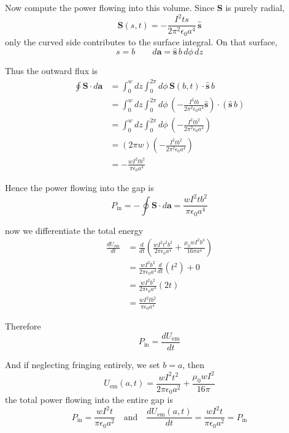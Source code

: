 \documentclass[12pt]{article}
\begin{document}
\begin{enumerate}
Now compute the power flowing into this volume. Since \(\mathbf S\) is purely radial,
$$
\mathbf S(s,t)
=
-\frac{I^2ts}{2\pi^2\epsilon_0 a^4}\,\hat{\mathbf s}
$$
only the curved side contributes to the surface integral. On that surface,
$$
s=b
\qquad
d\mathbf a=\hat{\mathbf s}\,b\,d\phi\,dz
$$

Thus the outward flux is
$$
\begin{aligned}
\oint \mathbf S\cdot d\mathbf a
&=
\int_0^w dz\int_0^{2\pi}d\phi\,
\mathbf S(b,t)\cdot \hat{\mathbf s}\,b \\
&=
\int_0^w dz\int_0^{2\pi}d\phi\,
\left(
-\frac{I^2tb}{2\pi^2\epsilon_0 a^4}\hat{\mathbf s}
\right)\cdot
\left(
\hat{\mathbf s}\,b
\right) \\
&=
\int_0^w dz\int_0^{2\pi}d\phi\,
\left(
-\frac{I^2tb^2}{2\pi^2\epsilon_0 a^4}
\right) \\
&=
(2\pi w)
\left(
-\frac{I^2tb^2}{2\pi^2\epsilon_0 a^4}
\right) \\
&=
-\frac{wI^2tb^2}{\pi\epsilon_0 a^4}
\end{aligned}
$$

Hence the power flowing into the gap is
$$
\boxed{
P_{\text{in}}
=
-\oint \mathbf S\cdot d\mathbf a
=
\frac{wI^2tb^2}{\pi\epsilon_0 a^4}
}
$$

now we differentiate the total energy
$$
\begin{aligned}
\frac{dU_{\text{em}}}{dt}
&=
\frac{d}{dt}
\left(
\frac{wI^2t^2b^2}{2\pi\epsilon_0 a^4}
+
\frac{\mu_0 wI^2b^4}{16\pi a^4}
\right) \\
&=
\frac{wI^2b^2}{2\pi\epsilon_0 a^4}\frac{d}{dt}(t^2)
+
0 \\
&=
\frac{wI^2b^2}{2\pi\epsilon_0 a^4}(2t) \\
&=
\frac{wI^2tb^2}{\pi\epsilon_0 a^4}
\end{aligned}
$$

Therefore
$$
P_{\text{in}}=\frac{dU_{\text{em}}}{dt}
$$

And if neglecting fringing entirely, we set \(b=a\), then
$$
\boxed{U_{\text{em}}(a,t)
=
\frac{wI^2t^2}{2\pi\epsilon_0 a^2}
+
\frac{\mu_0 wI^2}{16\pi}}
$$
the total power flowing into the entire gap is
$$
\boxed{
P_{\text{in}}
=
\frac{wI^2t}{\pi\epsilon_0 a^2}
}\quad
\text{and} \quad  \frac{dU_{\text{em}}(a,t)}{dt}
=
\frac{wI^2t}{\pi\epsilon_0 a^2}
=
P_{\text{in}}
$$
\end{enumerate}
\end{document}
